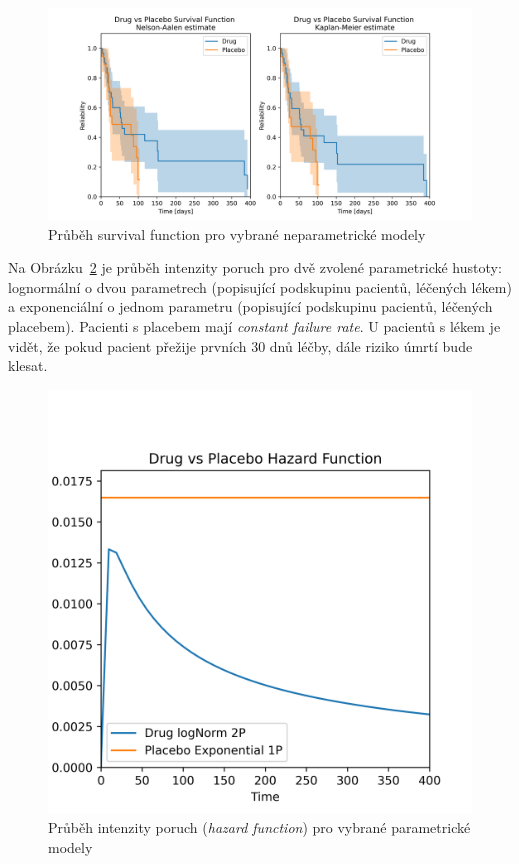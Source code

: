 \documentclass[a4, 11pt]{article}
\theoremstyle{definition}
\theoremstyle{remark}
\begin{document}
   	\begin{figure}[H]
        \centering
        \includegraphics[width=0.9\linewidth]{img/survival_function_drug_vs_placebo_NON_parametric.png}
        \caption{Průběh survival function pro vybrané neparametrické modely}
        \label{fig:SF_for_nonparametric}
    \end{figure}    
    
    Na Obrázku~\ref{fig:HF_for_parametric} je průběh intenzity poruch pro dvě zvolené parametrické hustoty: lognormální o dvou parametrech (popisující podskupinu pacientů, léčených lékem) a exponenciální o jednom parametru (popisující podskupinu pacientů, léčených placebem).
    Pacienti s placebem mají \textit{constant failure rate}. U pacientů s lékem je vidět, že pokud pacient přežije prvních 30 dnů léčby, dále riziko úmrtí bude klesat.
    
   	\begin{figure}[H]
        \centering
        \includegraphics[width=0.5\linewidth]{img/hazard_rate_drug_vs_placebo_parametric_my_choice.png}
        \caption{Průběh intenzity poruch (\textit{hazard function}) pro vybrané parametrické modely}
        \label{fig:HF_for_parametric}
    \end{figure} 
    
\end{document}
